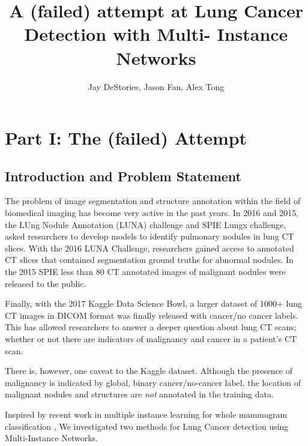 \documentclass[twocolumn,10pt]{article}
\title{A (failed) attempt at Lung Cancer Detection with Multi-
Instance Networks}
\author{Jay DeStories, Jason Fan, Alex Tong}
\begin{document}
\maketitle{}

\section{Part I: The (failed) Attempt}
\subsection{Introduction and Problem Statement}
The problem of image segmentation and structure annotation within the 
field of biomedical imaging has become very active in
the past years. In 2016 and 2015, the LUng Nodule Annotation (LUNA) challenge and 
SPIE Lungx challenge, asked researchers to develop models to identify pulmonary 
nodules in lung CT slices. With the 2016 LUNA Challenge, researchers gained access
to annotated CT slices that contained segmentation ground truths for abnormal 
nodules. 
In the 2015 SPIE less than 80 CT annotated images of malignant nodules were 
released to the public.

Finally, with the 2017 Kaggle Data Science Bowl, a larger dataset of
1000+ lung CT images in DICOM format was finally released with cancer/no cancer 
labels. This has allowed researchers to answer a deeper question about lung CT
scans; whether or not there are indicators of malignancy and cancer in a patient's
CT scan.

There is, however, one caveat to the Kaggle dataset. 
Although the presence of malignancy is indicated by global, binary 
cancer/no-cancer label, the location of malignant nodules and structures are
\textit{not} annotated in the training data.

Inspired by recent work in multiple instance learning for 
whole mammogram classification
\cite{DBLP:journals/corr/ZhuLVX16},
We investigated two methods for Lung Cancer detection using Multi-Instance 
Networks.
\end{document}
